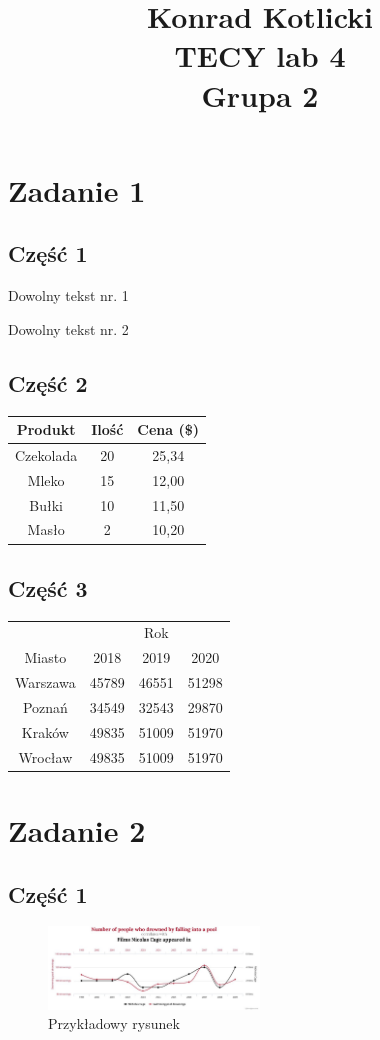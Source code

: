 \documentclass[a4paper]{article}
\title{Konrad Kotlicki\\TECY lab 4\\Grupa 2}
\begin{document}
\maketitle
\tableofcontents
\pagebreak


\section{Zadanie 1}
\subsection{Część 1}
Dowolny tekst nr. 1\par Dowolny tekst nr. 2

\subsection{Część 2}
\begin{tabular}{c | c | c}
Produkt & Ilość & Cena (\$) \\ \hline
Czekolada & 20 & 25,34 \\
Mleko & 15 & 12,00 \\
Bułki & 10 & 11,50 \\
Masło & 2 & 10,20 \\
\end{tabular}


\subsection{Część 3}
\begin{tabular}{c | c c c} 
& & Rok & \\ \cline{2-4}
Miasto & 2018 & 2019 & 2020 \\ \hline
Warszawa & 45789 & 46551 & 51298 \\
Poznań & 34549 & 32543 & 29870 \\
Kraków & 49835 & 51009 & 51970 \\
Wrocław & 49835 & 51009 & 51970 \\
\end{tabular}


\pagebreak
\section{Zadanie 2}
\subsection{Część 1}
\begin{figure}[h]
\centering
\includegraphics[width=0.5\textwidth]{Example_Data.jpeg}
\caption{\label{fig:rysunek_1}Przykładowy rysunek}
\end{figure}
\end{document}
